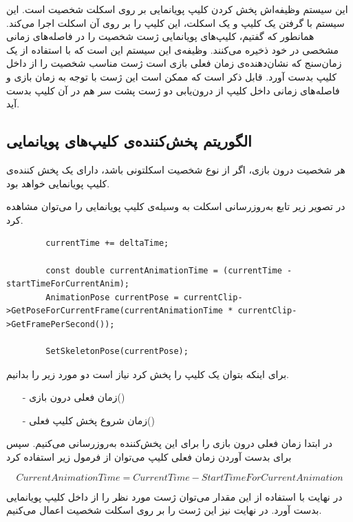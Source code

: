 این سیستم وظیفه‌اش پخش کردن کلیپ پویانمایی بر روی اسکلت شخصیت است.
این سیستم با گرفتن یک کلیپ و یک اسکلت، این کلیپ را بر روی آن اسکلت اجرا می‌کند.
همانطور که گفتیم، کلیپ‌های پویانمایی ژست شخصیت را در فاصله‌های زمانی مشخصی در خود ذخیره ‌می‌کنند. وظیفه‌ی این سیستم این است که با استفاده از یک زمان‌سنج که نشان‌دهنده‌ی زمان فعلی بازی است ژست مناسب شخصیت را از داخل کلیپ بدست آورد.
قابل ذکر است که ممکن است این ژست با توجه به زمان بازی و فاصله‌های زمانی داخل کلیپ
از درون‌یابی دو ژست پشت سر هم در آن کلیپ بدست آید.

\subsection{الگوریتم پخش‌کننده‌ی کلیپ‌های پویانمایی }

هر شخصیت درون بازی، اگر از نوع شخصیت اسکلتونی باشد، دارای یک پخش کننده‌ی کلیپ پویانمایی خواهد بود.

در تصویر زیر تابع به‌روزرسانی اسکلت به وسیله‌ی کلیپ پویانمایی را می‌توان مشاهده کرد.

\begin{latin}
	\begin{lstlisting}
		currentTime += deltaTime;

		const double currentAnimationTime = (currentTime - startTimeForCurrentAnim);
		AnimationPose currentPose = currentClip->GetPoseForCurrentFrame(currentAnimationTime * currentClip->GetFramePerSecond());
		
		SetSkeletonPose(currentPose);
	\end{lstlisting}
\end{latin}	



برای اینکه بتوان یک کلیپ را پخش کرد نیاز است دو مورد زیر را بدانیم.

\begin{enumerate}
	\item[-] زمان فعلی درون بازی()
	\item[-] زمان شروع پخش کلیپ فعلی() 
\end{enumerate}

در ابتدا زمان فعلی درون بازی را برای این پخش‌کننده به‌روزرسانی می‌کنیم.
سپس برای بدست آوردن زمان فعلی کلیپ می‌توان از فرمول زیر استفاده کرد

\[CurrentAnimationTime = CurrentTime - StartTimeForCurrentAnimation\]

در نهایت با استفاده از این مقدار می‌توان ژست مورد نظر را از داخل کلیپ پویانمایی بدست ‌آورد.
در نهایت نیز این ژست را بر روی اسکلت شخصیت اعمال می‌کنیم.


